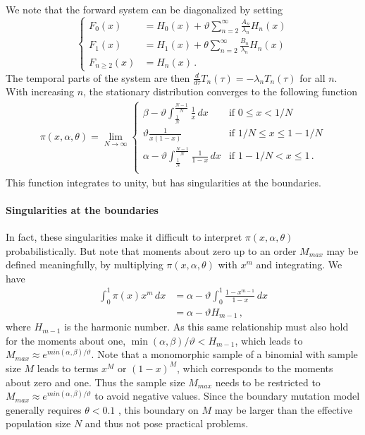 \documentclass[preprint]{elsarticle}
\begin{document}
We note that the forward system can be diagonalized by setting 
\begin{equation}\label{eq:forw_bound_diag}
\begin{cases}
    F_0(x)&=H_0(x)+\vartheta \sum_{n=2}^\infty \frac{A_n}{\lambda_n}H_n(x)\\
    F_1(x)&=H_1(x)+\theta \sum_{n=2}^\infty \frac{B_n}{\lambda_n} H_n(x)\\
    F_{n\geq2}(x)&=H_n(x)\,.
\end{cases}
\end{equation}
The temporal parts of the system are then $\frac{d}{d\tau} T_n(\tau)= -\lambda_n T_n(\tau)$ for all $n$. With increasing $n$, the stationary distribution converges to the following function \citep{Vogl15,Vogl16}
\begin{align}\label{eq:forw_bounddrift-stat}
  \pi(x, \alpha, \theta) = \lim_{N\to\infty}
  \begin{cases}
    \beta-\vartheta \int_{\tfrac1N}^{\tfrac{N-1}N} \frac1x\,dx     & \text{if } 0 \leq x < 1/N         \\
    \vartheta\frac{1}{x(1-x)}                                                 & \text{if } 1/N \le x \le 1-1/N \\
    \alpha-\vartheta \int_{\tfrac1N}^{\tfrac{N-1}N} \frac1{1-x}\,dx  & \text{if } 1-1/N < x \leq 1 \,.      \\
\end{cases}
\end{align}
This function integrates to unity, but has singularities at the boundaries. 
\paragraph{Singularities at the boundaries} In fact, these singularities make it difficult to interpret  $\pi(x,\alpha,\theta)$ probabilistically. But note that moments about zero up to an order $M_{max}$ may be defined meaningfully, by multiplying $\pi(x,\alpha,\theta)$ with $x^m$ and integrating. We have
\begin{equation}
\begin{split}
    \int_0^1 \pi(x) x^m \, dx&= \alpha -\vartheta\int_0^1 \frac{1-x^{m-1}}{1-x}\,dx\\
    &=\alpha-\vartheta H_{m-1}\,,
\end{split}
\end{equation}
where $H_{m-1}$ is the harmonic number. As this same relationship must also hold for the moments about one, $\min(\alpha,\beta)/\vartheta< H_{m-1}$, which leads to $M_{max}\approx e^{min(\alpha,\beta)/\vartheta}$.
Note that a monomorphic sample of a binomial with sample size $M$ leads to terms $x^M$ or $(1-x)^M$, which corresponds to the moments about zero and one. Thus the sample size $M_{max}$ needs to be restricted to $M_{max}\approx e^{min(\alpha,\beta)/\vartheta}$ to avoid negative values. Since the boundary mutation model generally requires $\theta<0.1$ \citep{Vogl15}, this boundary on $M$ may be larger than the effective population size $N$ and thus not pose practical problems. 
\end{document}
